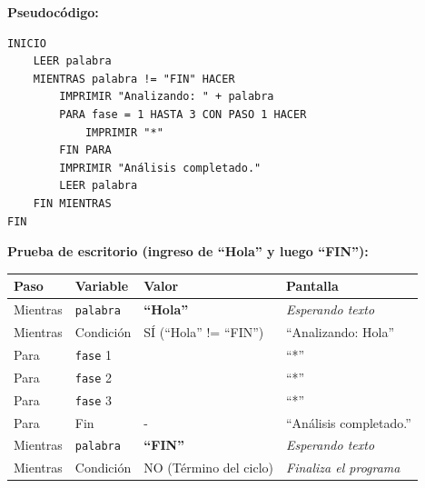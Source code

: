 \textbf{Pseudocódigo:}

\begin{verbatim}
INICIO
    LEER palabra
    MIENTRAS palabra != "FIN" HACER
        IMPRIMIR "Analizando: " + palabra
        PARA fase = 1 HASTA 3 CON PASO 1 HACER
            IMPRIMIR "*"
        FIN PARA
        IMPRIMIR "Análisis completado."
        LEER palabra
    FIN MIENTRAS
FIN
\end{verbatim}

\textbf{Prueba de escritorio (ingreso de ``Hola'' y luego ``FIN''):}

{\def\LTcaptype{none} %
\begin{longtable}[]{@{}
  >{\centering\arraybackslash}p{}
  >{\centering\arraybackslash}p{}
  >{\centering\arraybackslash}p{}
  >{\raggedright\arraybackslash}p{}@{}}
\toprule\noalign{}
\begin{minipage}[b]{\linewidth}\centering
Paso
\end{minipage} & \begin{minipage}[b]{\linewidth}\centering
Variable
\end{minipage} & \begin{minipage}[b]{\linewidth}\centering
Valor
\end{minipage} & \begin{minipage}[b]{\linewidth}\raggedright
Pantalla
\end{minipage} \\
\midrule\noalign{}
\endhead
\bottomrule\noalign{}
\endlastfoot
Mientras & \texttt{palabra} & \textbf{``Hola''} & \emph{Esperando
texto} \\
Mientras & Condición & SÍ (``Hola'' != ``FIN'') & ``Analizando:
Hola'' \\
Para & \texttt{fase} 1 & 1 & ``*'' \\
Para & \texttt{fase} 2 & 2 & ``*'' \\
Para & \texttt{fase} 3 & 3 & ``*'' \\
Para & Fin & - & ``Análisis completado.'' \\
Mientras & \texttt{palabra} & \textbf{``FIN''} & \emph{Esperando
texto} \\
Mientras & Condición & NO (Término del ciclo) & \emph{Finaliza el
programa} \\
\end{longtable}
}

